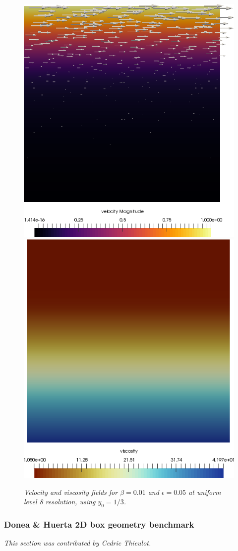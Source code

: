\documentclass{article}
\begin{document}
\begin{figure}
\begin{center}
  \centering
  \includegraphics[height=0.48\textwidth]{cookbooks/benchmarks/layeredflow/vel}
  \includegraphics[height=0.48\textwidth]{cookbooks/benchmarks/layeredflow/viscosity}
  \caption{\it Velocity and viscosity fields for $\beta=0.01$ and
    $\epsilon=0.05$ at uniform level 8 resolution, using $y_0=1/3$.}  
  \label{fig:layeredflow2}
\end{center}
\end{figure}









\subsubsection{Donea \& Huerta 2D box geometry benchmark}
\label{sec:benchmark-donea-huerta}

\textit{This section was contributed by Cedric Thieulot.}
\end{document}
